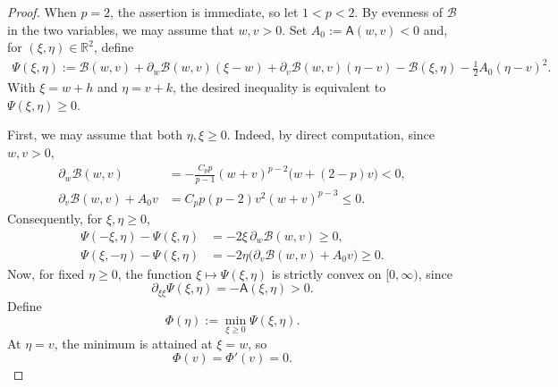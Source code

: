 \documentclass[10pt,a4paper]{amsart}
\newcommand{\R}{\mathbb{R}}
\begin{document}
\begin{proof}
When $p=2$, the assertion is immediate, so let
$1<p<2$. By evenness of $\mathcal B$ in the two variables, we may
assume that $w,v>0$. Set $A_0:=\mathsf A(w,v)<0$
and, for $(\xi,\eta)\in\R^2$, define
\[
\begin{aligned}
\Psi(\xi,\eta)
:=\mathcal B(w,v)
+\partial_w\mathcal B(w,v)(\xi-w)
+\partial_v\mathcal B(w,v)(\eta-v)
-\mathcal B(\xi,\eta)-\frac12A_0(\eta-v)^2.
\end{aligned}
\]
With $\xi=w+h$ and $\eta=v+k$, the desired inequality is equivalent to
$\Psi(\xi,\eta)\geq0$.

First, we may assume that both $\eta,\xi\geq0$. Indeed, by direct computation, since $w,v>0$,
\begin{align*}
\partial_w\mathcal B(w,v)
&=-\frac{C_pp}{p-1}(w+v)^{p-2}\bigl(w+(2-p)v\bigr)<0,\\
\partial_v\mathcal B(w,v)+A_0v
&=C_pp(p-2)v^2(w+v)^{p-3}\leq0.
\end{align*}
Consequently, for $\xi,\eta\geq0$,
\begin{align*}
\Psi(-\xi,\eta)-\Psi(\xi,\eta)
&=-2\xi\,\partial_w\mathcal B(w,v)\geq0,\\
\Psi(\xi,-\eta)-\Psi(\xi,\eta)
&=-2\eta\bigl(\partial_v\mathcal B(w,v)+A_0v\bigr)\geq0.
\end{align*}
Now, for fixed $\eta\geq0$, the function
$\xi\mapsto\Psi(\xi,\eta)$ is strictly convex on $[0,\infty)$, since
\[
\partial_{\xi\xi}\Psi(\xi,\eta)=-\mathsf A(\xi,\eta)>0.
\]
Define
\[
\Phi(\eta):=\min_{\xi\geq0}\Psi(\xi,\eta).
\]
At $\eta=v$, the minimum is attained at $\xi=w$, so
\[
\Phi(v)=\Phi'(v)=0.
\]


\end{proof}
\end{document}
